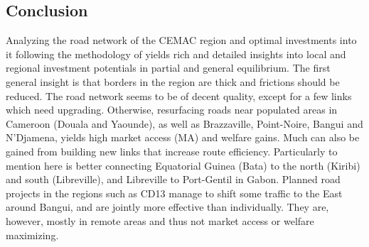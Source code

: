 \documentclass[a4paper]{article}
\begin{document}
\newpage

\subsection{Conclusion} 

Analyzing the road network of the CEMAC region and optimal investments into it following the methodology of \citet{krantz2024optimal} yields rich and detailed insights into local and regional investment potentials in partial and general equilibrium. The first general insight is that borders in the region are thick and frictions should be reduced. The road network seems to be of decent quality, except for a few links which need upgrading. Otherwise, resurfacing roads near populated areas in Cameroon (Douala and Yaounde), as well as Brazzaville, Point-Noire, Bangui and N'Djamena, yields high market access (MA) and welfare gains. Much can also be gained from building new links that increase route efficiency. Particularly to mention here is better connecting Equatorial Guinea (Bata) to the north (Kiribi) and south (Libreville), and Libreville to Port-Gentil in Gabon. Planned road projects in the regions such as CD13 manage to shift some traffic to the East around Bangui, and are jointly more effective than individually. They are, however, mostly in remote areas and thus not market access or welfare maximizing. %


\newpage


\end{document}
